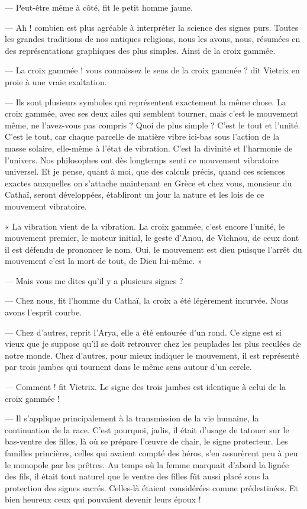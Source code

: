 \documentclass[a4paper, 11pt, oneside, polutonikogreek, french]{article}
\begin{document}
--- Peut-être même à côté, fit le petit homme jaune.

--- Ah ! combien est plus agréable à interpréter la science des signes purs. Toutes les grandes traditions de nos antiques religions, nous les avons, nous, résumées en des représentations graphiques des plus simples. Ainsi de la croix gammée.

--- La croix gammée ! vous connaissez le sens de la croix gammée ? dit Vietrix en proie à une vraie exaltation.

--- Ils sont plusieurs symboles qui représentent exactement la même chose. La croix gammée, avec ses deux ailes qui semblent tourner, mais c'est le mouvement même, ne l'avez-vous pas compris ? Quoi de plus simple ? C'est le tout et l'unité. C'est le tout, car chaque parcelle de matière vibre ici-bas sous l'action de la masse solaire, elle-même à l'état de vibration. C'est la divinité et l'harmonie de l'univers. Nos philosophes ont dès longtemps senti ce mouvement vibratoire universel. Et je pense, quant à moi, que des calculs précis, quand ces sciences exactes auxquelles on s'attache maintenant en Grèce et chez vous, monsieur du Cathaï, seront développées, établiront un jour la nature et les lois de ce mouvement vibratoire.

« La vibration vient de la vibration. La croix gammée, c'est encore l'unité, le mouvement premier, le moteur initial, le geste d'Anou, de Vichnou, de ceux dont il est défendu de prononcer le nom. Oui, le mouvement est dieu puisque l'arrêt du mouvement c'est la mort de tout, de Dieu lui-même. »

--- Mais vous me dites qu'il y a plusieurs signes ?

--- Chez nous, fit l'homme du Cathaï, la croix a été légèrement incurvée. Nous avons l'esprit courbe.

--- Chez d'autres, reprit l'Arya, elle a été entourée d'un rond. Ce signe est si vieux que je suppose qu'il se doit retrouver chez les peuplades les plus reculées de notre monde. Chez d'autres, pour mieux indiquer le mouvement, il est représenté par trois jambes qui tournent dans le même sens autour d'un cercle.

--- Comment ! fit Vietrix. Le signe des trois jambes est identique à celui de la croix gammée !

--- Il s'applique principalement à la transmission de la vie humaine, la continuation de la race. C'est pourquoi, jadis, il était d'usage de tatouer sur le bas-ventre des filles, là où se prépare l'œuvre de chair, le signe protecteur. Les familles princières, celles qui avaient compté des héros, s'en assurèrent peu à peu le monopole par les prêtres. Au temps où la femme marquait d'abord la lignée des fils, il était tout naturel que le ventre des filles fût aussi placé sous la protection des signes sacrés. Celles-là étaient considérées comme prédestinées. Et bien heureux ceux qui pouvaient devenir leurs époux !
\end{document}
